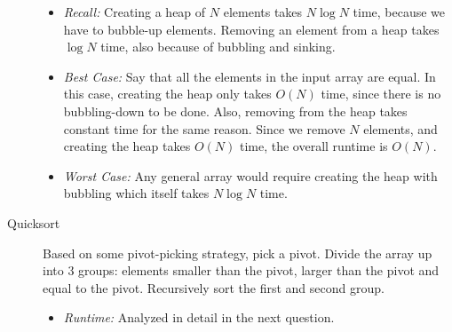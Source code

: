 \begin{solution}
\begin{description}
\begin{itemize}
\item \textit{Recall:} Creating a heap of $N$ elements takes $N \log N$ time,
because we have to bubble-up elements. Removing an element from a heap takes
$\log N$ time, also because of bubbling and sinking.
\item \textit{Best Case:} Say that all the elements in the input array are
equal. In this case, creating the heap only takes $O(N)$ time, since there is
no bubbling-down to be done. Also, removing from the heap takes constant time
for the same reason. Since we remove $N$ elements, and creating the heap takes
$O(N)$ time, the overall runtime is $O(N)$.
\item \textit{Worst Case:} Any general array would require creating the heap
with bubbling which itself takes $N \log N$ time.
\end{itemize}

\item[Quicksort]
Based on some pivot-picking strategy, pick a pivot.  Divide the array up into 3
groups: elements smaller than the pivot, larger than the pivot and equal to the
pivot. Recursively sort the first and second group.

\begin{itemize}
\item \textit{Runtime:} Analyzed in detail in the next question.
\end{itemize}
\end{description}
\end{solution}
